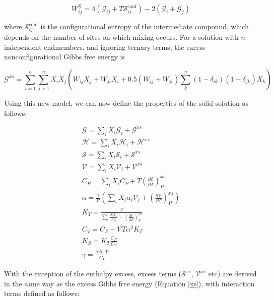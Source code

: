 \documentclass[review]{elsarticle}
\begin{document}
\begin{equation}
  W^{\mathcal{G}}_{ij} = 4(\mathcal{G}_{ij} + T\mathcal{S}^{\textrm{conf}}_{ij}) - 2(\mathcal{G}_i + \mathcal{G}_j)
\end{equation}

\noindent where $\mathcal{S}^{\textrm{conf}}_{ij}$ is the configurational entropy of the intermediate compound, which depends on the number of sites on which mixing occurs. For a solution with $n$ independent endmembers, and ignoring ternary terms, the excess nonconfigurational Gibbs free energy is \citep{HW1989} 

\begin{equation}
  \mathcal{G}^{xs} = \sum_{i=1}^n \sum_{j>1}^n X_i X_j \left ( W_{ij} X_j + W_{ji} X_i + 0.5 (W_{ij} + W_{ji}) \sum_k^n (1-\delta_{ik})(1-\delta_{jk}) X_k \right)
  \label{xs}
\end{equation}

Using this new model, we can now define the properties of the solid solution as follows:

\begin{eqnarray}
\mathcal{G} = \sum_i X_i \mathcal{G}_i + \mathcal{G}^{xs} \\
\mathcal{H} = \sum_i X_i \mathcal{H}_i + \mathcal{H}^{xs} \\
\mathcal{S} = \sum_i X_i \mathcal{S}_i + \mathcal{S}^{xs} \\
\mathcal{V} = \sum_i X_i \mathcal{V}_i + \mathcal{V}^{xs} \\
C_P = \sum_i X_i C_P  + T \left( \frac{\partial \mathcal{S}}{\partial T} \right)_P^{xs} \\
\alpha = \frac{1}{\mathcal{V}} \left ( \sum_i X_i \alpha_i \mathcal{V}_i + \left( \frac{\partial \mathcal{V}}{\partial T} \right)_P^{xs} \right) \label{alpha} \\
K_T = \frac{\mathcal{V}}{\sum_i \frac{X_i \mathcal{V}_i }{K_{Ti}} - \left( \frac{\partial \mathcal{V}}{\partial P} \right)_T^{xs} } \label{K_T} \\
C_V = C_P - \mathcal{V} T \alpha^2 K_T \\
K_S = K_T \frac{C_P}{C_V} \\
\gamma = \frac{\alpha K_T \mathcal{V}}{C_V}   
\end{eqnarray}

With the exception of the enthalpy excess, excess terms ($\mathcal{S}^{xs}$, $\mathcal{V}^{xs}$ etc) are derived in the same way as the excess Gibbs free energy (Equation \ref{xs}), with interaction terms defined as follows:
\end{document}
